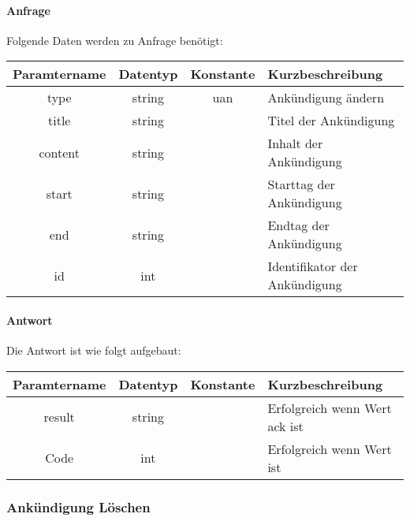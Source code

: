 \paragraph{Anfrage}Folgende Daten werden zu Anfrage benötigt:
\begin{table}[H]
	\begin{tabular}{|c|c|c|p{6.5cm}|}
		\hline
		\textbf{Paramtername} & \textbf{Datentyp} & \textbf{Konstante} & \textbf{Kurzbeschreibung}                                                                                               \\ \hline
		type                & string            & uan                & Ankündigung ändern \\ \hline
		title               & string            &                    & Titel der Ankündigung \\ \hline
		content             & string            &                    & Inhalt der Ankündigung \\ \hline
		start               & string            &                    & Starttag der Ankündigung \\ \hline
		end                 & string            &                    & Endtag  der Ankündigung \\ \hline
		id                  & int               &                    & Identifikator der Ankündigung \\ \hline
	\end{tabular}
\end{table}
\paragraph{Antwort}Die Antwort ist wie folgt aufgebaut:
\begin{table}[H]
	\begin{tabular}{|c|c|c|p{6.5cm}|}
		\hline
		\textbf{Paramtername} & \textbf{Datentyp} & \textbf{Konstante} & \textbf{Kurzbeschreibung}                                                                                               \\ \hline
		result              & string           &                 & Erfolgreich wenn Wert {\glqq ack\grqq} ist \\ \hline
		Code                & int              &                 & Erfolgreich wenn Wert {\glqq 0\grqq} ist \\ \hline
	\end{tabular}
\end{table}
\subsubsection{Ankündigung Löschen}
